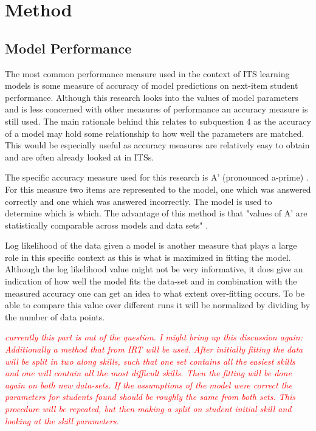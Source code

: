 \documentclass{scrartcl}
\newcommand\todo[1]{\textit{\textcolor{red}{#1}}}
\begin{document}
\section{Method}


\subsection{Model Performance}

\label{sec:perf}
The most common performance measure used in the context of ITS learning models is some measure of accuracy of model predictions on next-item student performance. Although this research looks into the values of model parameters and is less concerned with other measures of performance an accuracy measure is still used. The main rationale behind this relates to subquestion 4 as the accuracy of a model may hold some relationship to how well the parameters are matched. This would be especially useful as accuracy measures are relatively easy to obtain and are often already looked at in ITSs. 

The specific accuracy measure used for this research is A' (pronounced a-prime) \cite{modelreview}. For this measure two items are represented to the model, one which was answered correctly and one which was answered incorrectly. The model is used to determine which is which. The advantage of this method is that "values of A' are statistically comparable across models and data sets" \cite{modelreview}.

Log likelihood of the data given a model is another measure that plays a large role in this specific context as this is what is maximized in fitting the model. Although the log likelihood value might not be very informative, it does give an indication of how well the model fits the data-set and in combination with the measured accuracy one can get an idea to what extent over-fitting occurs. To be able to compare this value over different runs it will be normalized by dividing by the number of data points.


\todo{currently this part is out of the question. I might bring up this discussion again:
Additionally a method that from IRT \cite{hambleton} will be used. After initially fitting the data will be split in two along skills, such that one set contains all the easiest skills and one will contain all the most difficult skills. Then the fitting will be done again on both new data-sets. If the assumptions of the model were correct the parameters for students found should be roughly the same from both sets. This procedure will be repeated, but then making a split on student initial skill and looking at the skill parameters.}
\end{document}
